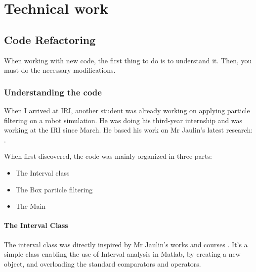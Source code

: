 \chapter{Technical work}

\label{technic}







\section{Code Refactoring}
When working with new code, the first thing to do is to understand it. Then, you must do the necessary modifications.
\subsection{Understanding the code}
When I arrived at IRI, another student was already working on applying particle filtering on a robot simulation.
He was doing his third-year internship and was working at the IRI since March. He based his work on Mr Jaulin's latest research: \parencite{Base}.

When first discovered, the code was mainly organized in three parts:
\begin{itemize}
  \item The Interval class
  \item The Box particle filtering
  \item The Main
\end{itemize}
\subsubsection{The Interval Class}
The interval class was directly inspired by Mr Jaulin's works and courses \parencite{IAMOOC}.
It's a simple class enabling the use of Interval analysis in Matlab, by creating a new object, and overloading the standard comparators and operators.\\

